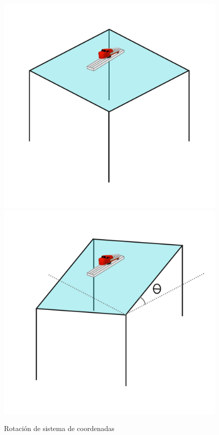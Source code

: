 \documentclass[11pt,a4paper]{article}
\begin{document}
\begin{figure}
  \centering
  \includegraphics[scale=0.4]{table}
  \includegraphics[scale=0.4]{tabletheta}
  \caption{Rotación de sistema de coordenadas}
  \label{fig:tabla}
\end{figure}
\end{document}
